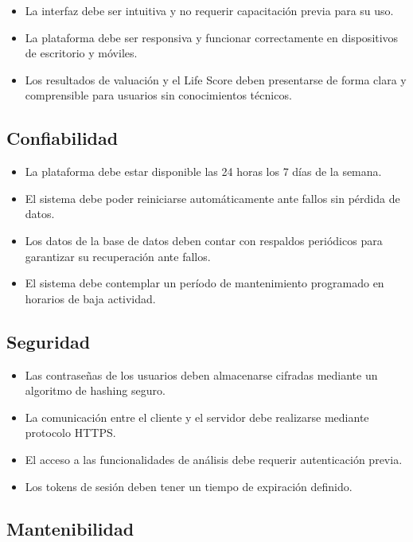 \begin{itemize}
\item La interfaz debe ser intuitiva y no requerir capacitación previa para su uso.
\item La plataforma debe ser responsiva y funcionar correctamente en dispositivos de escritorio y móviles.
\item Los resultados de valuación y el Life Score deben presentarse de forma clara y comprensible para usuarios sin conocimientos técnicos.
\end{itemize}

\subsection{Confiabilidad}

\begin{itemize}
\item La plataforma debe estar disponible las 24 horas los 7 días de la semana.
\item El sistema debe poder reiniciarse automáticamente ante fallos sin pérdida de datos.
\item Los datos de la base de datos deben contar con respaldos periódicos para garantizar su recuperación ante fallos.
\item El sistema debe contemplar un período de mantenimiento programado en horarios de baja actividad.
\end{itemize}

\subsection{Seguridad}

\begin{itemize}
\item Las contraseñas de los usuarios deben almacenarse cifradas mediante un algoritmo de hashing seguro.
\item La comunicación entre el cliente y el servidor debe realizarse mediante protocolo HTTPS.
\item El acceso a las funcionalidades de análisis debe requerir autenticación previa.
\item Los tokens de sesión deben tener un tiempo de expiración definido.
\end{itemize}

\subsection{Mantenibilidad}

